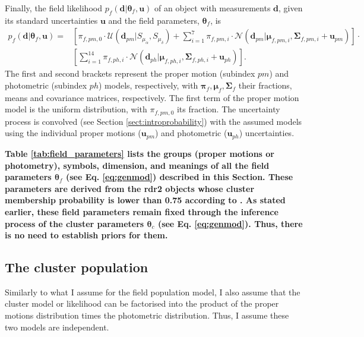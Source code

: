 Finally, the field likelihood $p_f(\mathbf{d}|\boldsymbol{\theta}_f,\mathbf{u})$ of an object with measurements $\mathbf{d}$, given its standard uncertainties $\mathbf{u}$ and the field parameters, $\boldsymbol{\theta}_f$, is
\begin{align}
p_f(\mathbf{d}|\boldsymbol{\theta}_f,\mathbf{u})=&\left[\pi_{f,pm,0}\cdot\mathcal{U}(\mathbf{d}_{pm}|S_{\mu_{\alpha}},S_{\mu_{\delta}})+  \sum \limits_{i=1}^{7}\pi_{f,pm,i}\cdot \mathcal{N}(\mathbf{d}_{pm} | \boldsymbol{\mu}_{f,pm,i},\boldsymbol{\Sigma}_{f,pm,i}+\mathbf{u}_{pm})\right]\cdot  \nonumber \\ 
&\left[ \sum \limits_{i=1}^{14}\pi_{f,ph,i}\cdot \mathcal{N}(\mathbf{d}_{ph} | \boldsymbol{\mu}_{f,ph,i},\boldsymbol{\Sigma}_{f,ph,i}+\mathbf{u}_{ph})\right].
\label{eq:field}
\end{align}
The first and second brackets represent the proper motion (subindex $pm$) and photometric (subindex $ph$) models, respectively, with $\boldsymbol{\pi}_f,\boldsymbol{\mu}_f,\boldsymbol{\Sigma}_f$ their fractions, means and covariance matrices, respectively. The first term of the proper motion model is the uniform distribution, with $\pi_{f,pm,0}$ its fraction. The uncertainty process is convolved (see Section \ref{sect:introprobability}) with the assumed models using the individual proper motions ($\mathbf{u}_{pm}$) and photometric ($\mathbf{u}_{ph}$) uncertainties. 

\textbf{Table \ref{tab:field_parameters} lists the groups (proper motions or photometry), symbols, dimension, and meanings of all the field parameters $\boldsymbol{\theta}_f$ (see Eq. \ref{eq:genmod}) described in this Section. These parameters are derived from the \gls{rdr2} objects whose cluster membership probability is lower than 0.75 according to \citet{Bouy2015}. As stated earlier, these field parameters remain fixed through the inference process of the cluster parameters $\boldsymbol{\theta}_c$ (see Eq. \ref{eq:genmod}). Thus, there is no need to establish priors for them. }



\subsection{The cluster population}
\label{subsect:cluster}
Similarly to what I assume for the field population model, I also assume that the cluster model or likelihood can be factorised into the product of the proper motions distribution times the photometric distribution. Thus, I assume these two models are independent. 


